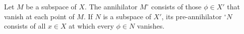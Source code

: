 Let $M$ be a subspace of $X$. The annihilator $M^\circ$ consists of those $\phi \in X'$ that vanish at each point of $M$. If $N$ is a subspace of $X'$, its pre-annihilator $^\circ N$ consists of all $x \in X$ at which every $\phi \in N$ vanishes.